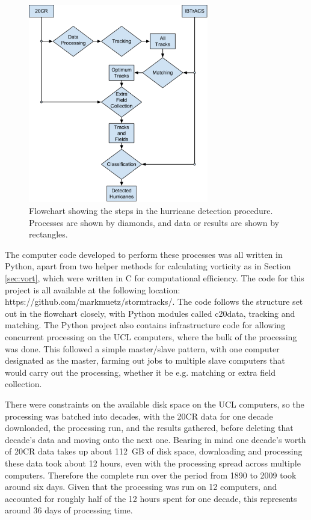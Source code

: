 \documentclass[pdftex,12pt,a4paper]{report}
\begin{document}
\begin{figure}[ht!]
    \centering
    \includegraphics[width=0.7\textwidth]{figures/hurricane_detection_procedure2}
    \caption{Flowchart showing the steps in the hurricane detection procedure. Processes are shown
    by diamonds, and data or results are shown by rectangles. }
    \label{fig:hurricane_detection_proc}
\end{figure}

\newpage
The computer code developed to perform these processes was all written in Python, apart from two
helper methods for calculating vorticity as in Section \ref{sec:vort}, which were written in C for
computational efficiency. The code for this project is all available at the following location:
https://github.com/markmuetz/stormtracks/. The code follows the structure set out in the flowchart
closely, with Python modules called c20data, tracking and matching. The Python project also contains
infrastructure code for allowing concurrent processing on the UCL computers, where the bulk of the
processing was done. This followed a simple master/slave pattern, with one computer designated as the
master, farming out jobs to multiple slave computers that would carry out the processing, whether it
be e.g. matching or extra field collection. 

There were constraints on the available disk space on the UCL computers, so the processing was
batched into decades, with the 20CR data for one decade downloaded, the processing run, and the
results gathered, before deleting that decade's data and moving onto the next one.  Bearing in mind
one decade's worth of 20CR data takes up about \SI{112}{GB} of disk space, downloading and
processing these data took about 12 hours, even with the processing spread across multiple
computers. Therefore the complete run over the period from 1890 to 2009 took around six days. Given
that the processing was run on 12 computers, and accounted for roughly half of the 12 hours spent
for one decade, this represents around 36 days of processing time.
\end{document}
